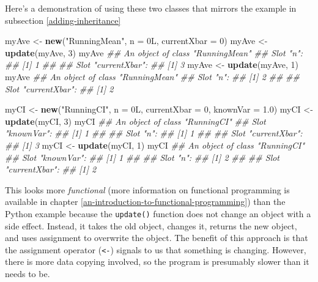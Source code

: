 \documentclass[12pt,krantz2]{krantz}
\makeatletter
\newenvironment{Shaded}{\begin{snugshade}}{\end{snugshade}}
\newcommand{\CommentTok}[1]{\textcolor[rgb]{0.37,0.37,0.37}{\textit{#1}}}
\newcommand{\DataTypeTok}[1]{\textcolor[rgb]{0.27,0.27,0.27}{#1}}
\newcommand{\DecValTok}[1]{\textcolor[rgb]{0.06,0.06,0.06}{#1}}
\newcommand{\FloatTok}[1]{\textcolor[rgb]{0.06,0.06,0.06}{#1}}
\newcommand{\KeywordTok}[1]{\textcolor[rgb]{0.27,0.27,0.27}{\textbf{#1}}}
\newcommand{\NormalTok}[1]{#1}
\newcommand{\StringTok}[1]{\textcolor[rgb]{0.5,0.5,0.5}{#1}}
\newenvironment{kframe}{%
\medskip{}
\setlength{\fboxsep}{.8em}
 \def\at@end@of@kframe{}%
 \ifinner\ifhmode%
  \def\at@end@of@kframe{\end{minipage}}%
  \begin{minipage}{\columnwidth}%
 \fi\fi%
 \def\FrameCommand##1{\hskip\@totalleftmargin \hskip-\fboxsep
 \colorbox{shadecolor}{##1}\hskip-\fboxsep
     \hskip-\linewidth \hskip-\@totalleftmargin \hskip\columnwidth}%
 \MakeFramed {\advance\hsize-\width
   \@totalleftmargin\z@ \linewidth\hsize
   \@setminipage}}%
 {\par\unskip\endMakeFramed%
 \at@end@of@kframe}
\renewenvironment{Shaded}{\begin{kframe}}{\end{kframe}}
\makeatother
\begin{document}
Here's a demonstration of using these two classes that mirrors the example in subsection \ref{adding-inheritance}

\begin{Shaded}
\begin{Highlighting}[]
\NormalTok{myAve <-}\StringTok{ }\KeywordTok{new}\NormalTok{(}\StringTok{"RunningMean"}\NormalTok{, }\DataTypeTok{n =}\NormalTok{ 0L, }\DataTypeTok{currentXbar =} \DecValTok{0}\NormalTok{)}
\NormalTok{myAve <-}\StringTok{ }\KeywordTok{update}\NormalTok{(myAve, }\DecValTok{3}\NormalTok{)}
\NormalTok{myAve}
\CommentTok{## An object of class "RunningMean"}
\CommentTok{## Slot "n":}
\CommentTok{## [1] 1}
\CommentTok{## }
\CommentTok{## Slot "currentXbar":}
\CommentTok{## [1] 3}
\NormalTok{myAve <-}\StringTok{ }\KeywordTok{update}\NormalTok{(myAve, }\DecValTok{1}\NormalTok{)}
\NormalTok{myAve}
\CommentTok{## An object of class "RunningMean"}
\CommentTok{## Slot "n":}
\CommentTok{## [1] 2}
\CommentTok{## }
\CommentTok{## Slot "currentXbar":}
\CommentTok{## [1] 2}

\NormalTok{myCI <-}\StringTok{ }\KeywordTok{new}\NormalTok{(}\StringTok{"RunningCI"}\NormalTok{, }\DataTypeTok{n =}\NormalTok{ 0L, }\DataTypeTok{currentXbar =} \DecValTok{0}\NormalTok{, }\DataTypeTok{knownVar =} \FloatTok{1.0}\NormalTok{)}
\NormalTok{myCI <-}\StringTok{ }\KeywordTok{update}\NormalTok{(myCI, }\DecValTok{3}\NormalTok{)}
\NormalTok{myCI}
\CommentTok{## An object of class "RunningCI"}
\CommentTok{## Slot "knownVar":}
\CommentTok{## [1] 1}
\CommentTok{## }
\CommentTok{## Slot "n":}
\CommentTok{## [1] 1}
\CommentTok{## }
\CommentTok{## Slot "currentXbar":}
\CommentTok{## [1] 3}
\NormalTok{myCI <-}\StringTok{ }\KeywordTok{update}\NormalTok{(myCI, }\DecValTok{1}\NormalTok{)}
\NormalTok{myCI}
\CommentTok{## An object of class "RunningCI"}
\CommentTok{## Slot "knownVar":}
\CommentTok{## [1] 1}
\CommentTok{## }
\CommentTok{## Slot "n":}
\CommentTok{## [1] 2}
\CommentTok{## }
\CommentTok{## Slot "currentXbar":}
\CommentTok{## [1] 2}
\end{Highlighting}
\end{Shaded}

This looks more \emph{functional} (more information on functional programming is available in chapter \ref{an-introduction-to-functional-programming}) than the Python example because the \texttt{update()} function does not change an object with a side effect. Instead, it takes the old object, changes it, returns the new object, and uses assignment to overwrite the object. The benefit of this approach is that the assignment operator (\texttt{\textless{}-})  signals to us that something is changing. However, there is more data copying involved, so the program is presumably slower than it needs to be.
\end{document}
